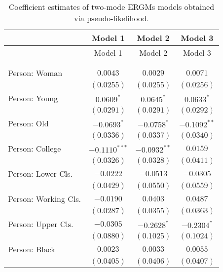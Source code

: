 
\begin{center}
\begin{longtable}{l c c c}
\toprule
 & Model 1 & Model 2 & Model 3 \\
\midrule
\endfirsthead
\toprule
 & Model 1 & Model 2 & Model 3 \\
\midrule
\endhead
\bottomrule
\endfoot
\bottomrule
\multicolumn{4}{l}{\scriptsize{$^{***}p<0.001$; $^{**}p<0.01$; $^{*}p<0.05$}}\\
\caption{Coefficient estimates of two-mode ERGMs models obtained via pseudo-likelihood.}
\label{tab:reg3}
\endlastfoot \\
Person: Woman                    & $0.0043$        & $0.0029$       & $0.0071$        \\
                                 & $(0.0255)$      & $(0.0255)$     & $(0.0256)$      \\
Person: Young                    & $0.0609^{*}$    & $0.0645^{*}$   & $0.0633^{*}$    \\
                                 & $(0.0291)$      & $(0.0291)$     & $(0.0292)$      \\
Person: Old                      & $-0.0693^{*}$   & $-0.0758^{*}$  & $-0.1092^{**}$  \\
                                 & $(0.0336)$      & $(0.0337)$     & $(0.0340)$      \\
Person: College                  & $-0.1110^{***}$ & $-0.0932^{**}$ & $0.0159$        \\
                                 & $(0.0326)$      & $(0.0328)$     & $(0.0411)$      \\
Person: Lower Cls.               & $-0.0222$       & $-0.0513$      & $-0.0305$       \\
                                 & $(0.0429)$      & $(0.0550)$     & $(0.0559)$      \\
Person: Working Cls.             & $-0.0190$       & $0.0403$       & $0.0487$        \\
                                 & $(0.0287)$      & $(0.0355)$     & $(0.0363)$      \\
Person: Upper Cls.               & $-0.0305$       & $-0.2628^{*}$  & $-0.2304^{*}$   \\
                                 & $(0.0880)$      & $(0.1025)$     & $(0.1024)$      \\
Person: Black                    & $0.0023$        & $0.0033$       & $0.0055$        \\
                                 & $(0.0405)$      & $(0.0406)$     & $(0.0407)$      \\

\end{longtable}
\end{center}
